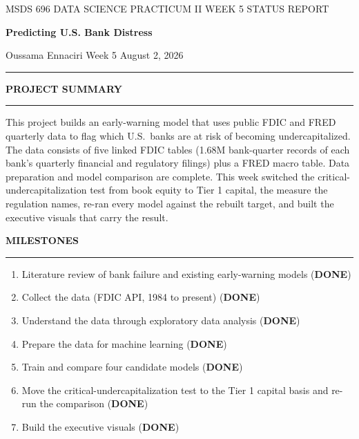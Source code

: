 \documentclass[11pt,letterpaper]{article}
\newcommand{\sectionhead}[1]{%
  \needspace{5\baselineskip}\vspace{6pt}%
  {\sffamily\bfseries\fontsize{9.5}{12}\selectfont\color{navy}\MakeUppercase{#1}}\par
  \vspace{-9pt}\textcolor{hairline}{\rule{\textwidth}{0.5pt}}\par\vspace{0pt}}
\newcommand{\answer}[1]{#1\par\vspace{3pt}}
\begin{document}
\vspace*{-14pt}
{\sffamily\fontsize{8.5}{11}\selectfont\color{midgray}MSDS 696 DATA SCIENCE PRACTICUM II \quad\textbar\quad WEEK 5 STATUS REPORT}\par\vspace{10pt}
{\sffamily\bfseries\fontsize{21}{25}\selectfont\color{navy}Predicting U.S. Bank Distress}\par\vspace{9pt}
{\sffamily\fontsize{9}{12}\selectfont Oussama Ennaciri \quad\textbar\quad Week 5 \quad\textbar\quad August 2, 2026}\par\vspace{5pt}
\textcolor{navy}{\rule{\textwidth}{1.2pt}}

\sectionhead{Project summary}
\answer{This project builds an early-warning model that uses public FDIC and FRED quarterly data to flag which U.S.\ banks are at risk of becoming undercapitalized. The data consists of five linked FDIC tables (1.68M bank-quarter records of each bank's quarterly financial and regulatory filings) plus a FRED macro table. Data preparation and model comparison are complete. This week switched the critical-undercapitalization test from book equity to Tier 1 capital, the measure the regulation names, re-ran every model against the rebuilt target, and built the executive visuals that carry the result.}

\sectionhead{Milestones}
\answer{\begin{enumerate}[topsep=1pt,itemsep=1pt,leftmargin=16pt,label=\textcolor{navy}{\bfseries\arabic*.}]
  \item Literature review of bank failure and existing early-warning models (\textbf{DONE})
  \item Collect the data (FDIC API, 1984 to present) (\textbf{DONE})
  \item Understand the data through exploratory data analysis (\textbf{DONE})
  \item Prepare the data for machine learning (\textbf{DONE})
  \item Train and compare four candidate models (\textbf{DONE})
  \item Move the critical-undercapitalization test to the Tier 1 capital basis and re-run the comparison (\textbf{DONE})
  \item Build the executive visuals (\textbf{DONE})
\end{enumerate}}
\end{document}
